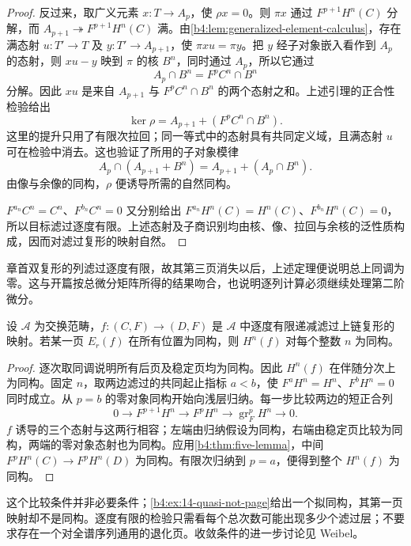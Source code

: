 \begin{proof}
	反过来，取广义元素 \(x:T\to A_p\)，使 \(\rho x=0\)。则 \(\pi x\) 通过 \(F^{p+1}H^n(C)\) 分解，而 \(A_{p+1}\twoheadrightarrow F^{p+1}H^n(C)\) 满。由\cref{b4:lem:generalized-element-calculus}，存在满态射 \(u:T'\to T\) 及 \(y:T'\to A_{p+1}\)，使 \(\pi xu=\pi y\)。把 \(y\) 经子对象嵌入看作到 \(A_p\) 的态射，则 \(xu-y\) 映到 \(\pi\) 的核 \(B^n\)，同时通过 \(A_p\)，所以它通过
	\[
		A_p\cap B^n=F^pC^n\cap B^n
	\]
	分解。因此 \(xu\) 是来自 \(A_{p+1}\) 与 \(F^pC^n\cap B^n\) 的两个态射之和。上述引理的正合性检验给出
	\[
		\ker\rho=A_{p+1}+(F^pC^n\cap B^n).
	\]
	这里的提升只用了有限次拉回；同一等式中的态射具有共同定义域，且满态射 \(u\) 可在检验中消去。这也验证了所用的子对象模律
	\[
		A_p\cap(A_{p+1}+B^n) =A_{p+1}+(A_p\cap B^n).
	\]
	由像与余像的同构，\(\rho\) 便诱导所需的自然同构。

	\(F^{a_n}C^n=C^n\)、\(F^{b_n}C^n=0\) 又分别给出 \(F^{a_n}H^n(C)=H^n(C)\)、\(F^{b_n}H^n(C)=0\)，所以目标滤过逐度有限。上述态射及子商识别均由核、像、拉回与余核的泛性质构成，因而对滤过复形的映射自然。
\end{proof}

章首双复形的列滤过逐度有限，故其第三页消失以后，上述定理便说明总上同调为零。这与开篇按总微分矩阵所得的结果吻合，也说明逐列计算必须继续处理第二阶微分。

\begin{corollary}\label{b4:cor:spectral-comparison-finite}
	设 \(\mathcal A\) 为交换范畴，\(f:(C,F)\to(D,F)\) 是 \(\mathcal A\) 中逐度有限递减滤过上链复形的映射。若某一页 \(E_r(f)\) 在所有位置为同构，则 \(H^n(f)\) 对每个整数 \(n\) 为同构。
\end{corollary}
\begin{proof}
	逐次取同调说明所有后页及稳定页均为同构。因此 \(H^n(f)\) 在伴随分次上为同构。固定 \(n\)，取两边滤过的共同起止指标 \(a<b\)，使 \(F^aH^n=H^n\)、\(F^bH^n=0\) 同时成立。从 \(p=b\) 的零对象同构开始向浅层归纳。每一步比较两边的短正合列
	\[
		0\longrightarrow F^{p+1}H^n\longrightarrow F^pH^n \longrightarrow\operatorname{gr}_F^pH^n\longrightarrow0.
	\]
	\(f\) 诱导的三个态射与这两行相容；左端由归纳假设为同构，右端由稳定页比较为同构，两端的零对象态射也为同构。应用\cref{b4:thm:five-lemma}，中间 \(F^pH^n(C)\to F^pH^n(D)\) 为同构。有限次归纳到 \(p=a\)，便得到整个 \(H^n(f)\) 为同构。
\end{proof}

这个比较条件并非必要条件；\cref{b4:ex:14-quasi-not-page}给出一个拟同构，其第一页映射却不是同构。逐度有限的检验只需看每个总次数可能出现多少个滤过层；不要求存在一个对全谱序列通用的退化页。收敛条件的进一步讨论见 Weibel\cite[Section 5.5, Classical Convergence Theorem 5.5.1]{Weibel1994HomologicalAlgebra}。

